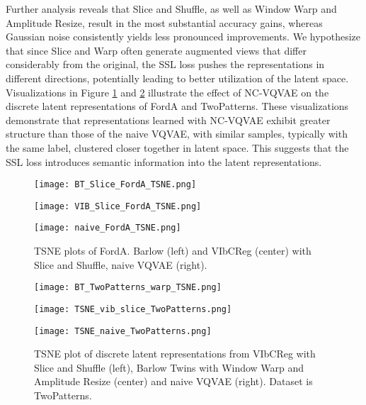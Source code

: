 \documentclass[../../thesis.tex]{subfiles}
\begin{document}
Further analysis reveals that Slice and Shuffle, as well as Window Warp and Amplitude Resize, result in the most substantial accuracy gains, whereas Gaussian noise consistently yields less pronounced improvements. We hypothesize that since Slice and Warp often generate augmented views that differ considerably from the original, the SSL loss pushes the representations in different directions, potentially leading to better utilization of the latent space. Visualizations in Figure \ref{fig:FordA_TSNE} and \ref{fig:TSNE_TwoPatterns} illustrate the effect of NC-VQVAE on the discrete latent representations of FordA and TwoPatterns. These visualizations demonstrate that representations learned with NC-VQVAE exhibit greater structure than those of the naive VQVAE, with similar samples, typically with the same label, clustered closer together in latent space. This suggests that the SSL loss introduces semantic information into the latent representations.\newline

\begin{figure}[h] 
    \centering
    \begin{minipage}[b]{0.32\textwidth}
        \centering
        \texttt{[image: BT\_Slice\_FordA\_TSNE.png]}
    \end{minipage}
    \hfill
    \begin{minipage}[b]{0.32\textwidth}
        \centering
        \texttt{[image: VIB\_Slice\_FordA\_TSNE.png]}
    \end{minipage}
    \hfill
    \begin{minipage}[b]{0.32\textwidth}
        \centering
        \texttt{[image: naive\_FordA\_TSNE.png]}
    \end{minipage}
    \caption{TSNE plots of FordA. Barlow (left) and VIbCReg (center) with Slice and Shuffle, naive VQVAE (right).}
    \label{fig:FordA_TSNE}
\end{figure}


\begin{figure}[h]
    \centering
    \begin{minipage}[b]{0.32\textwidth}
        \centering
        \texttt{[image: BT\_TwoPatterns\_warp\_TSNE.png]}
    \end{minipage}
    \hfill
    \begin{minipage}[b]{0.32\textwidth}
        \centering
        \texttt{[image: TSNE\_vib\_slice\_TwoPatterns.png]}
    \end{minipage}
    \hfill
    \begin{minipage}[b]{0.32\textwidth}
        \centering
        \texttt{[image: TSNE\_naive\_TwoPatterns.png]}
    \end{minipage}
    \caption{TSNE plot of discrete latent representations from VIbCReg with Slice and Shuffle (left), Barlow Twins with Window Warp and Amplitude Resize (center) and naive VQVAE (right). Dataset is TwoPatterns.}
    \label{fig:TSNE_TwoPatterns}
\end{figure}
\end{document}
